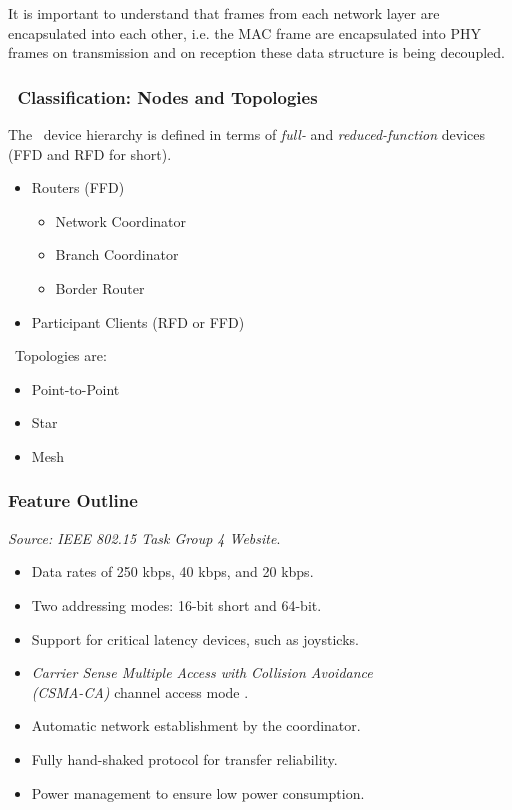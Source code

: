 It is important to understand that frames from each network layer are
encapsulated into each other, i.e. the MAC frame are encapsulated into
PHY frames on transmission and on reception these data structure is
being decoupled.


\subsubsection{\WPAN\ Classification: Nodes and Topologies}

  The \WPAN\ device hierarchy is defined in terms of \emph{full-}
  and \emph{reduced-function} devices (FFD and RFD for short).
  
  \begin{itemize}
 	\item Routers (FFD) 
	\begin{itemize}
		\item Network Coordinator
		\item Branch Coordinator
		\item Border Router
	\end{itemize}
	\item Participant Clients (RFD or FFD)
  \end{itemize}

  \WPAN\ Topologies are:
  \begin{itemize}
  	\item Point-to-Point
	\item Star
	\item Mesh
  \end{itemize}

\subsubsection{Feature Outline} \label{sec:P802154}
\emph{Source: IEEE 802.15 Task Group 4 Website}\cite{links:ieee:802:15:4}.

\begin{itemize}
	\item Data rates of 250 kbps, 40 kbps, and 20 kbps.

	\item Two addressing modes: 16-bit short and 64-bit.

	\item Support for critical latency devices, such as joysticks.

	\item \emph{Carrier Sense Multiple Access with Collision
		Avoidance \\(CSMA-CA)} channel access mode \cite{links:wiki:csma}.

	\item Automatic network establishment by the coordinator.

	\item Fully hand-shaked protocol for transfer reliability.

	\item Power management to ensure low power consumption.

\end{itemize}


